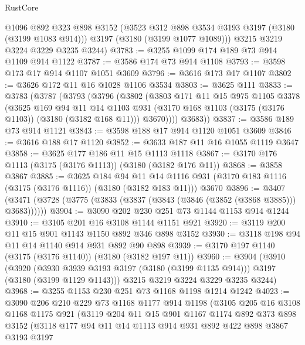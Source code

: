 \begin{lexlean}{RustCore}
\begin{coremodule}
        @1096
        @892
        @323
        @898
        @3152
        (@3523 @312 @898 @3534 @3193 @3197 (@3180 (@3199 @1083 @914)))
        @3197
        (@3180 (@3199 @1077 @1089)))
      @3215
      @3219
      @3224
      @3229
      @3235
      @3244)
@3783 := @3255 @1099 @174 @189 @73 @914 @1109 @914 @1122
@3787 := @3586 @174 @73 @914 @1108
@3793 := @3598 @173 @17 @914 @1107 @1051 @3609
@3796 := @3616 @173 @17 @1107
@3802 := @3626 @172 @11 @16 @1028 @1106 @3534
@3803 := @3625 @111
@3833 := @3783
    (@3787
      (@3793
        (@3796
          (@3802
            (@3803
              @171
              @11
              @15
              @975
              @1105
              @3378
              (@3625
                @169
                @94
                @11
                @14
                @1103
                @931
                (@3170 @168 @1103 (@3175 (@3176 @1103)) (@3180 (@3182 @168 @11)))
                @3670))))
        @3683))
@3837 := @3586 @189 @73 @914 @1121
@3843 := @3598 @188 @17 @914 @1120 @1051 @3609
@3846 := @3616 @188 @17 @1120
@3852 := @3633 @187 @11 @16 @1055 @1119 @3647
@3858 := @3625 @177 @186 @11 @15 @1113 @1118
@3867 := @3170 @176 @1113 (@3175 (@3176 @1113)) (@3180 (@3182 @176 @11))
@3868 := @3858 @3867
@3885 := @3625
    @184
    @94
    @11
    @14
    @1116
    @931
    (@3170 @183 @1116 (@3175 (@3176 @1116)) (@3180 (@3182 @183 @11)))
    @3670
@3896 := @3407 (@3471 (@3728 (@3775 (@3833 (@3837 (@3843 (@3846 (@3852 (@3868 @3885))) @3683))))))
@3904 := @3090 @202 @230 @251 @73 @1144 @1153 @914 @1244
@3910 := @3105 @201 @16 @3108 @1144 @1151 @921
@3920 := @3119 @200 @11 @15 @901 @1143 @1150 @892 @346 @898 @3152
@3930 := @3118 @198 @94 @11 @14 @1140 @914 @931 @892 @90 @898
@3939 := @3170 @197 @1140 (@3175 (@3176 @1140)) (@3180 (@3182 @197 @11))
@3960 := @3904
    (@3910
      (@3920 (@3930 @3939 @3193 @3197 (@3180 (@3199 @1135 @914))) @3197 (@3180 (@3199 @1129 @1143)))
      @3215
      @3219
      @3224
      @3229
      @3235
      @3244)
@3968 := @3255 @1153 @230 @251 @73 @1168 @1198 @1214 @1242
@4023 := @3090
    @206
    @210
    @229
    @73
    @1168
    @1177
    @914
    @1198
    (@3105
      @205
      @16
      @3108
      @1168
      @1175
      @921
      (@3119
        @204
        @11
        @15
        @901
        @1167
        @1174
        @892
        @373
        @898
        @3152
        (@3118
          @177
          @94
          @11
          @14
          @1113
          @914
          @931
          @892
          @422
          @898
          @3867
          @3193
          @3197

\end{coremodule}
\end{lexlean}
